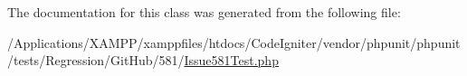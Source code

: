 The documentation for this class was generated from the following file\+:\begin{DoxyCompactItemize}
\item 
/\+Applications/\+X\+A\+M\+P\+P/xamppfiles/htdocs/\+Code\+Igniter/vendor/phpunit/phpunit/tests/\+Regression/\+Git\+Hub/581/\mbox{\hyperlink{_issue581_test_8php}{Issue581\+Test.\+php}}\end{DoxyCompactItemize}
